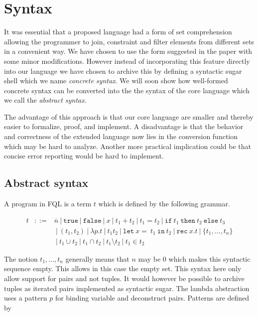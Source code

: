 \documentclass[a4paper]{article}
\newcommand{\buzz}[1]{{\sl #1}}
\newcommand{\pipe}{\ | \ }
\newcommand{\s}[1]{\mathtt{#1}}
\newcommand{\sn}{\overline{n}}
\newcommand{\sLb}{\s{\{}}
\newcommand{\sRb}{\s{\}}}
\newcommand{\sif}{\s{if\ }}
\newcommand{\sthen}{\s{\ then\ }}
\newcommand{\selse}{\s{\ else\ }}
\newcommand{\sifthenelse}[3]{\sif #1 \sthen #2 \selse #3}
\newcommand{\sletin}[2]{\s{let\ } #1 \s{\ in\ } #2}
\newcommand{\srec}{\s{rec\ }}
\newcommand{\strue}{\s{true}}
\newcommand{\sfalse}{\s{false}}
\newcommand{\seq}{\s{=\ }}
\newcommand{\sset}[1]{\sLb #1 \sRb}
\begin{document}
\section{Syntax}
\label{sec:syntax}

It was essential that a proposed language had a form of set comprehension allowing the programmer to join, constraint and filter elements from different sets in a convenient way. We have chosen to use the form suggested in the paper with some minor modifications. However instead of incorporating this feature directly into our language we have chosen to archive this by defining a syntactic sugar shell which we name \buzz{concrete syntax}. We will soon show how well-formed concrete syntax can be converted into the the syntax of the core language which we call the \buzz{abstract syntax}. 

The advantage of this approach is that our core language are smaller and thereby easier to formalize, proof, and implement. A disadvantage is that the behavior and correctness of the extended language now lies in the conversion function which may be hard to analyze. Another more practical implication could be that concise error reporting would be hard to implement.

\subsection{Abstract syntax}
\label{abstractSyntax}

A program in FQL is a term $t$ which is defined by the following grammar.

\begin{eqnarray*}
t & ::= & \sn \pipe \strue \pipe \sfalse \pipe x \pipe t_1 + t_2 \pipe t_1
= t_2 \pipe \sifthenelse{t_1}{t_2}{t_3} \\
& & \pipe (t_1,
t_2) \pipe \lambda p.t \pipe t_1 t_2 \pipe \sletin{x \seq t_1}{t_2}
\pipe \srec x.t \pipe \sset{t_1,\ldots,t_n}\\ 
& & \pipe t_1 \cup t_2 \pipe t_1 \cap t_2 \pipe t_1 \setminus t_2 \pipe t_1 \in t_2 
\end{eqnarray*}

The notion $t_1,\ldots,t_n$ generally means that $n$ may be $0$ which
makes this syntactic sequence empty. This allows in this case the
empty set. This syntax here only allow support for pairs and not
tuples. It would however be possible to archive tuples as iterated
pairs implemented as syntactic sugar. The lambda abstraction uses a pattern $p$ for binding variable and deconstruct pairs. Patterns are defined by
\end{document}
